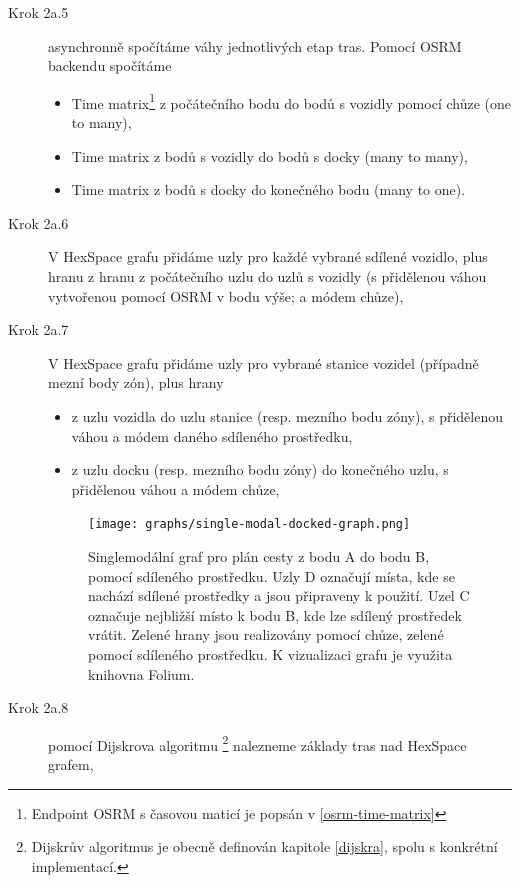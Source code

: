 \documentclass[thesis=M,czech]{FITthesis}[2019/12/23]
\theoremstyle{plain}
\theoremstyle{definition}
\begin{document}
\begin{description}
\begin{description}
		\item [Krok 2a.5] asynchronně spočítáme váhy jednotlivých etap tras. Pomocí OSRM backendu spočítáme 
		\begin{itemize}
			\item Time matrix\footnote{Endpoint OSRM s časovou maticí je popsán v \ref{osrm-time-matrix}} z počátečního bodu do bodů s vozidly pomocí chůze (one to many),
			\item Time matrix z bodů s vozidly do bodů s docky (many to many),
			\item Time matrix z bodů s docky do konečného bodu (many to one).
		\end{itemize}
		
		\item [Krok 2a.6] V HexSpace grafu přidáme uzly pro každé vybrané sdílené vozidlo, plus hranu z hranu z počátečního uzlu do uzlů s vozidly (s přidělenou váhou vytvořenou pomocí OSRM v bodu výše; a módem chůze),
		\item [Krok 2a.7] V HexSpace grafu přidáme uzly pro vybrané stanice vozidel (případně mezní body zón), plus hrany 
		\begin{itemize}
			\item z uzlu vozidla do uzlu stanice (resp. mezního bodu zóny), s přidělenou váhou a módem daného sdíleného prostředku,
			\item z uzlu docku (resp. mezního bodu zóny) do konečného uzlu, s přidělenou váhou a módem chůze,
		\end{itemize}

		\begin{figure}[H]\centering
			\texttt{[image: graphs/single-modal-docked-graph.png]}
		
			\caption[Singlemodální graf pro plán cesty z bodu A do bodu B.]{Singlemodální graf pro plán cesty z bodu A do bodu B, pomocí sdíleného prostředku. Uzly D označují místa, kde se nachází sdílené prostředky a jsou připraveny k použití. Uzel C označuje nejbližší místo k bodu B, kde lze sdílený prostředek vrátit. Zelené hrany jsou realizovány pomocí chůze, zelené pomocí sdíleného prostředku. K vizualizaci grafu je využita knihovna Folium. \cite{folium}}\label{fig:singlemodal-graph}
		
		\end{figure}
		

		\item [Krok 2a.8] pomocí Dijskrova algoritmu \footnote{Dijskrův algoritmus je obecně definován kapitole \ref{dijskra}, spolu s konkrétní implementací.} nalezneme základy tras nad HexSpace grafem,


\end{description}
\end{description}
\end{document}
